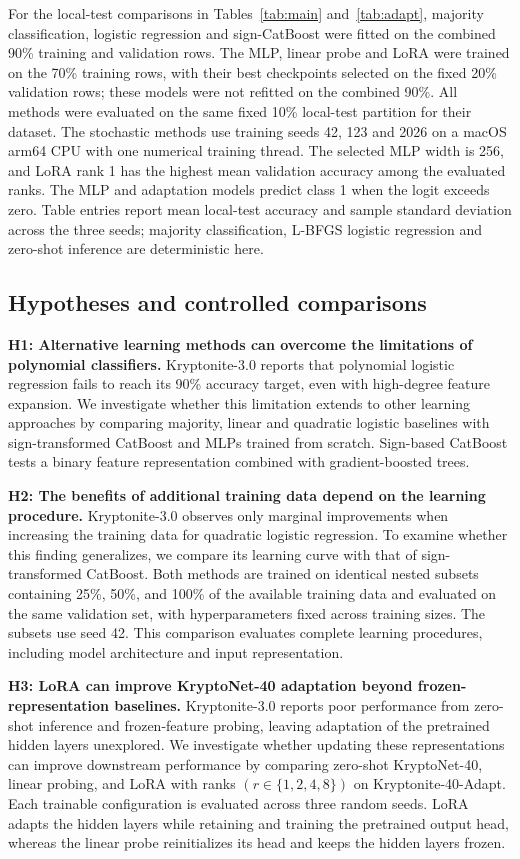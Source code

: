 \documentclass{article}
\begin{document}
For the local-test comparisons in Tables~\ref{tab:main} and~\ref{tab:adapt}, majority classification, logistic regression and sign-CatBoost were fitted on the combined 90\% training and validation rows. The MLP, linear probe and LoRA were trained on the 70\% training rows, with their best checkpoints selected on the fixed 20\% validation rows; these models were not refitted on the combined 90\%. All methods were evaluated on the same fixed 10\% local-test partition for their dataset. The stochastic methods use training seeds 42, 123 and 2026 on a macOS arm64 CPU with one numerical training thread. The selected MLP width is 256, and LoRA rank 1 has the highest mean validation accuracy among the evaluated ranks. The MLP and adaptation models predict class 1 when the logit exceeds zero. Table entries report mean local-test accuracy and sample standard deviation across the three seeds; majority classification, L-BFGS logistic regression and zero-shot inference are deterministic here.

\subsection{Hypotheses and controlled comparisons}
\textbf{H1: Alternative learning methods can overcome the limitations of polynomial classifiers.} Kryptonite-3.0 reports that polynomial logistic regression fails to reach its 90\% accuracy target, even with high-degree feature expansion. We investigate whether this limitation extends to other learning approaches by comparing majority, linear and quadratic logistic baselines with sign-transformed CatBoost and MLPs trained from scratch. Sign-based CatBoost tests a binary feature representation combined with gradient-boosted trees.

\textbf{H2: The benefits of additional training data depend on the learning procedure.} Kryptonite-3.0 observes only marginal improvements when increasing the training data for quadratic logistic regression. To examine whether this finding generalizes, we compare its learning curve with that of sign-transformed CatBoost. Both methods are trained on identical nested subsets containing 25\%, 50\%, and 100\% of the available training data and evaluated on the same validation set, with hyperparameters fixed across training sizes. The subsets use seed 42. This comparison evaluates complete learning procedures, including model architecture and input representation.

\textbf{H3: LoRA can improve KryptoNet-40 adaptation beyond frozen-representation baselines.} Kryptonite-3.0 reports poor performance from zero-shot inference and frozen-feature probing, leaving adaptation of the pretrained hidden layers unexplored. We investigate whether updating these representations can improve downstream performance by comparing zero-shot KryptoNet-40, linear probing, and LoRA with ranks $(r\in\{1,2,4,8\})$ on Kryptonite-40-Adapt. Each trainable configuration is evaluated across three random seeds. LoRA adapts the hidden layers while retaining and training the pretrained output head, whereas the linear probe reinitializes its head and keeps the hidden layers frozen.
\end{document}
